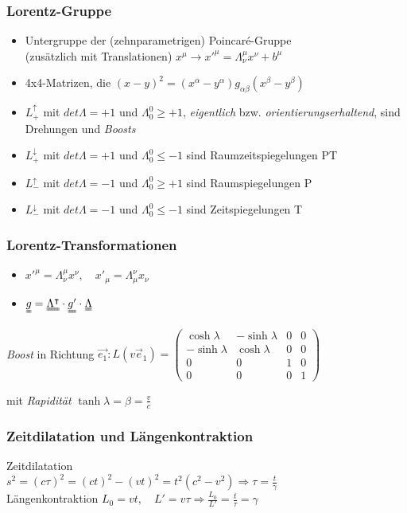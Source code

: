 \documentclass{beamer}
\begin{document}
\begin{frame}\frametitle{Lorentz-Gruppe}

\begin{itemize}
\item Untergruppe der (zehnparametrigen) Poincaré-Gruppe\\ (zusätzlich mit Translationen) $x^{\mu} \to x'^{\mu} = \Lambda^{\mu}_{\nu} x^{\nu} + b^{\mu}$
\item 4x4-Matrizen, die $(x - y)^2 = (x^{\alpha} - y^{\alpha})g_{\alpha\beta}(x^{\beta} - y^{\beta})$
\item $L_+^{\uparrow}$ mit $det \Lambda = +1$ und $\Lambda_0^0 \geq +1$, \textit{eigentlich} bzw. \textit{orientierungserhaltend}, sind Drehungen und \textit{Boosts}
\item $L_+^{\downarrow}$ mit $det \Lambda = +1$ und $\Lambda_0^0 \leq -1$ sind Raumzeitspiegelungen PT
\item $L_-^{\uparrow}$ mit $det \Lambda = -1$ und $\Lambda_0^0 \geq +1$ sind Raumspiegelungen P
\item $L_-^{\downarrow}$ mit $det \Lambda = -1$ und $\Lambda_0^0 \leq -1$ sind Zeitspiegelungen T
\end{itemize}

\end{frame}

\begin{frame}\frametitle{Lorentz-Transformationen}

\begin{itemize}
\item $x'^{\mu} = \Lambda^{\mu}_{\nu} x^{\nu}, \quad x'_{\mu} = \Lambda_{\mu}^{\nu} x_{\nu}$
\item $\uuline{g} = \uuline{\Lambda^\intercal} \cdot \uuline{g'} \cdot \uuline{\Lambda}$
\end{itemize}


\textit{Boost} in Richtung $\vec{e_1}: L(v \vec e_1) =
\begin{pmatrix}
 \cosh \lambda & -\sinh \lambda & 0 & 0\\
-\sinh \lambda &  \cosh \lambda & 0 & 0\\
 0 & 0 & 1 & 0\\
 0 & 0 & 0 & 1
\end{pmatrix}$

mit \textit{Rapidität} $\tanh \lambda = \beta = \frac{v}{c}$

\end{frame}

\begin{frame}\frametitle{Zeitdilatation und Längenkontraktion}

Zeitdilatation\\
$s^2 = (c\tau)^2 = (ct)^2 - (vt)^2 = t^2 (c^2 - v^2) \Rightarrow \boxed{\tau = \frac{t}{\gamma}}$\\[.5cm]

Längenkontraktion
$L_0 = v t, \quad L' = v \tau \Rightarrow \boxed{\frac{L_0}{L'} = \frac{t}{\tau} = \gamma}$

\end{frame}
\end{document}
